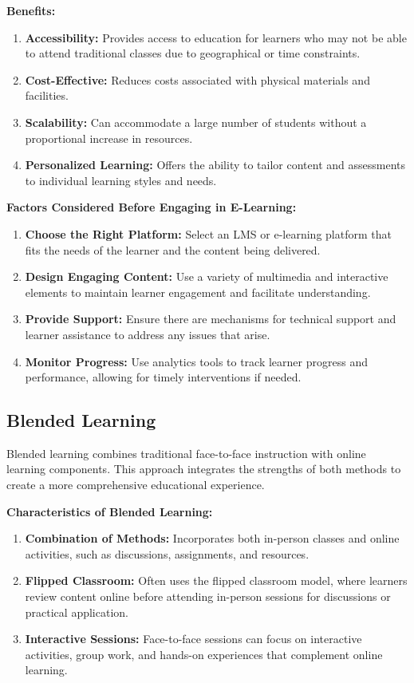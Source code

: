 \documentclass[10pt]{article}
\begin{document}
\textbf{Benefits:}
\begin{enumerate}[label=\alph*)]
    \item \textbf{Accessibility:} Provides access to education for learners who may not be able to attend traditional classes due to geographical or time constraints.
    \item \textbf{Cost-Effective:} Reduces costs associated with physical materials and facilities.
    \item \textbf{Scalability:} Can accommodate a large number of students without a proportional increase in resources.
    \item \textbf{Personalized Learning:} Offers the ability to tailor content and assessments to individual learning styles and needs.
\end{enumerate}

\textbf{Factors Considered Before Engaging in E-Learning:}
\begin{enumerate}[label=\roman*.]
    \item \textbf{Choose the Right Platform:} Select an LMS or e-learning platform that fits the needs of the learner and the content being delivered.
    \item \textbf{Design Engaging Content:} Use a variety of multimedia and interactive elements to maintain learner engagement and facilitate understanding.
    \item \textbf{Provide Support:} Ensure there are mechanisms for technical support and learner assistance to address any issues that arise.
    \item \textbf{Monitor Progress:} Use analytics tools to track learner progress and performance, allowing for timely interventions if needed.
\end{enumerate}

\subsection*{Blended Learning}

Blended learning combines traditional face-to-face instruction with online learning components. This approach integrates the strengths of both methods to create a more comprehensive educational experience.

\textbf{Characteristics of Blended Learning:}
\begin{enumerate}[label=\alph*)]
    \item \textbf{Combination of Methods:} Incorporates both in-person classes and online activities, such as discussions, assignments, and resources.
    \item \textbf{Flipped Classroom:} Often uses the flipped classroom model, where learners review content online before attending in-person sessions for discussions or practical application.
    \item \textbf{Interactive Sessions:} Face-to-face sessions can focus on interactive activities, group work, and hands-on experiences that complement online learning.
\end{enumerate}
\end{document}
